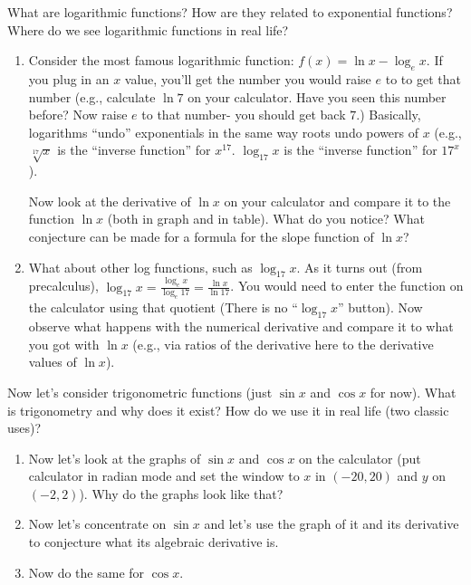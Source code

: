 \documentclass{ximera}
\begin{document}
\begin{exercise} 
What are logarithmic functions?  How are they related to exponential functions?  Where do we see logarithmic functions in real life?
\begin{enumerate}
\item	Consider the most famous logarithmic function:   $f(x) = \ln x - \log_e x$.  If you plug in an $x$ value, you'll get the number you would raise $e$ to to get that number (e.g., calculate $\ln 7$ on your calculator.  Have you seen this number before?  Now raise $e$ to that number- you should get back $7$.)  Basically, logarithms ``undo'' exponentials in the same way roots undo powers of $x$ (e.g., $\sqrt[17]{x}$ is the ``inverse function'' for  $x^{17}$. $\log_{17}x$   is the ``inverse function'' for  $17^x$).

Now look at the derivative of $\ln x$ on your calculator and compare it to the function $\ln x$ (both in graph and in table).  What do you notice?  What conjecture can be made for a formula for the slope function of $\ln x$?
\item	What about other log functions, such as  $\log_{17} x$.  As it turns out (from precalculus), $\log_{17} x = \frac{\log_e x}{\log_e 17} = \frac{\ln x}{\ln 17}$.  You would need to enter the function on the calculator using that quotient (There is no ``$\log_{17} x$'' button).  Now observe what happens with the numerical derivative and compare it to what you got with $\ln x$ (e.g., via ratios of the derivative here to the derivative values of $\ln x$).
\end{enumerate}
\end{exercise}
\begin{exercise} 
Now let's consider trigonometric functions (just $\sin x$ and $\cos x$ for now).  What is trigonometry and why does it exist?  How do we use it in real life (two classic uses)?
\begin{enumerate}
\item	Now let's look at the graphs of $\sin x$ and $\cos x$ on the calculator (put calculator in radian mode and set the window to $x$ in $(-20, 20)$ and $y$ on $(-2,2)$).  Why do the graphs look like that?
\item	Now let's concentrate on $\sin x$ and let's use the graph of it and its derivative to conjecture what its algebraic derivative is.
\item	Now do the same for $\cos x$.
\end{enumerate}
\end{exercise}
\end{document}
